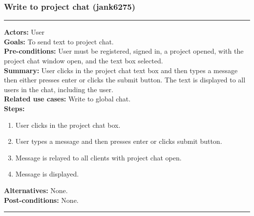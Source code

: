 \documentclass[11pt]{report}
\begin{document}
\subsubsection{Write to project chat (jank6275)}
\vspace{2pt}
\hrule
\vspace{8pt}
 \textbf{Actors:} User \\ 
 \textbf{Goals:} To send text to project chat. \\
 \textbf{Pre-conditions:} User must be registered, signed in, a project opened, with the project chat window open, and the text box selected.  \\
 \textbf{Summary:} User clicks in the project chat text box and then types a message then either presses enter or clicks the submit button. The text is displayed to all users in the chat, including the user. \\ 
 \textbf{Related use cases:} Write to global chat. \\ 
 \textbf{Steps:} \begin{enumerate}
  \item User clicks in the project chat box.
  \item User types a message and then presses enter or clicks submit button.
  \item Message is relayed to all clients with project chat open.
  \item Message is displayed.
 \end{enumerate}
 \textbf{Alternatives:} None. \\
 \textbf{Post-conditions:} None. \\
 \vspace{8pt}
\hrule
\newpage
\end{document}
